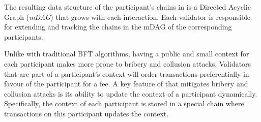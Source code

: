 The resulting data structure of the participant's chains in \codename{} is a Directed Acyclic Graph (\emph{mDAG}) that grows with each interaction. Each validator is responsible for extending and tracking the chains in the mDAG of the corresponding participants. 

Unlike with traditional BFT algorithms, having a public and small context for each participant makes \codename{} more prone to bribery and collusion attacks. Validators that are part of a participant's context will order transactions preferentially in favour of the participant for a fee. A key feature of \codename{} that mitigates bribery and collusion attacks is its ability to update the context of a participant dynamically. Specifically, the context of each participant is stored in a special chain where transactions on this participant updates the context.


	
	
